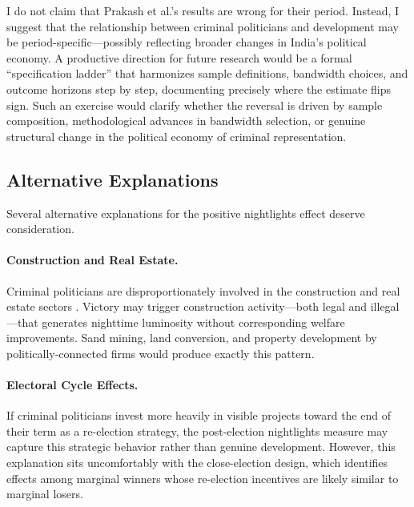 \documentclass[12pt]{article}
\begin{document}
I do not claim that Prakash et al.'s results are wrong for their period. Instead, I suggest that the relationship between criminal politicians and development may be period-specific---possibly reflecting broader changes in India's political economy. A productive direction for future research would be a formal ``specification ladder'' that harmonizes sample definitions, bandwidth choices, and outcome horizons step by step, documenting precisely where the estimate flips sign. Such an exercise would clarify whether the reversal is driven by sample composition, methodological advances in bandwidth selection, or genuine structural change in the political economy of criminal representation.

\subsection{Alternative Explanations}

Several alternative explanations for the positive nightlights effect deserve consideration.

\paragraph{Construction and Real Estate.} Criminal politicians are disproportionately involved in the construction and real estate sectors \citep{vaishnav2017}. Victory may trigger construction activity---both legal and illegal---that generates nighttime luminosity without corresponding welfare improvements. Sand mining, land conversion, and property development by politically-connected firms would produce exactly this pattern.

\paragraph{Electoral Cycle Effects.} If criminal politicians invest more heavily in visible projects toward the end of their term as a re-election strategy, the post-election nightlights measure may capture this strategic behavior rather than genuine development. However, this explanation sits uncomfortably with the close-election design, which identifies effects among marginal winners whose re-election incentives are likely similar to marginal losers.
\end{document}
